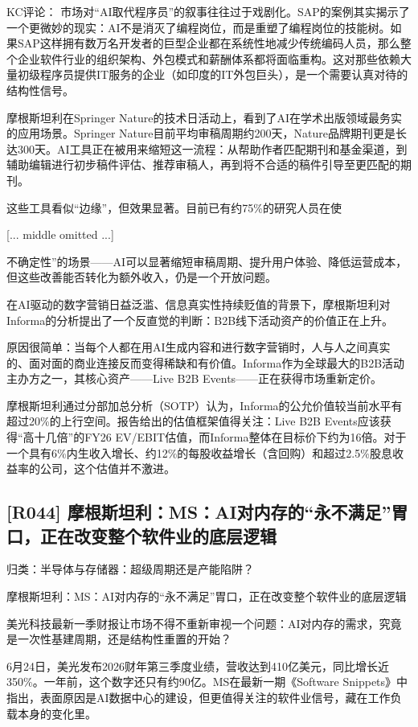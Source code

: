 \documentclass[11pt]{ctexart}
\begin{document}
KC评论： 市场对“AI取代程序员”的叙事往往过于戏剧化。SAP的案例其实揭示了一个更微妙的现实：AI不是消灭了编程岗位，而是重塑了编程岗位的技能树。如果SAP这样拥有数万名开发者的巨型企业都在系统性地减少传统编码人员，那么整个企业软件行业的组织架构、外包模式和薪酬体系都将面临重构。这对那些依赖大量初级程序员提供IT服务的企业（如印度的IT外包巨头），是一个需要认真对待的结构性信号。

摩根斯坦利在Springer Nature的技术日活动上，看到了AI在学术出版领域最务实的应用场景。Springer Nature目前平均审稿周期约200天，Nature品牌期刊更是长达300天。AI工具正在被用来缩短这一流程：从帮助作者匹配期刊和基金渠道，到辅助编辑进行初步稿件评估、推荐审稿人，再到将不合适的稿件引导至更匹配的期刊。

这些工具看似“边缘”，但效果显著。目前已有约75\%的研究人员在使

[... middle omitted ...]

不确定性”的场景——AI可以显著缩短审稿周期、提升用户体验、降低运营成本，但这些改善能否转化为额外收入，仍是一个开放问题。

在AI驱动的数字营销日益泛滥、信息真实性持续贬值的背景下，摩根斯坦利对Informa的分析提出了一个反直觉的判断：B2B线下活动资产的价值正在上升。

原因很简单：当每个人都在用AI生成内容和进行数字营销时，人与人之间真实的、面对面的商业连接反而变得稀缺和有价值。Informa作为全球最大的B2B活动主办方之一，其核心资产——Live B2B Events——正在获得市场重新定价。

摩根斯坦利通过分部加总分析（SOTP）认为，Informa的公允价值较当前水平有超过20\%的上行空间。报告给出的估值框架值得关注：Live B2B Events应该获得“高十几倍”的FY26 EV/EBIT估值，而Informa整体在目标价下约为16倍。对于一个具有6\%内生收入增长、约12\%的每股收益增长（含回购）和超过2.5\%股息收益率的公司，这个估值并不激进。

\subsection{[R044] 摩根斯坦利：MS：AI对内存的“永不满足”胃口，正在改变整个软件业的底层逻辑}
{\small\color{refgray}归类：半导体与存储器：超级周期还是产能陷阱？}

摩根斯坦利：MS：AI对内存的“永不满足”胃口，正在改变整个软件业的底层逻辑

美光科技最新一季财报让市场不得不重新审视一个问题：AI对内存的需求，究竟是一次性基建周期，还是结构性重置的开始？

6月24日，美光发布2026财年第三季度业绩，营收达到410亿美元，同比增长近350\%。一年前，这个数字还只有约90亿。MS在最新一期《Software Snippets》中指出，表面原因是AI数据中心的建设，但更值得关注的软件业信号，藏在工作负载本身的变化里。
\end{document}
